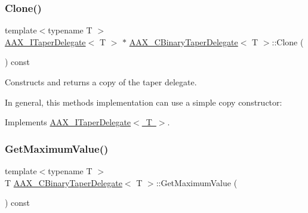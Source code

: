 \subsubsection{\texorpdfstring{Clone()}{Clone()}}
{\footnotesize\ttfamily template$<$typename T $>$ \\
\mbox{\hyperlink{a01881}{A\+A\+X\+\_\+\+I\+Taper\+Delegate}}$<$ T $>$ $\ast$ \mbox{\hyperlink{a01457}{A\+A\+X\+\_\+\+C\+Binary\+Taper\+Delegate}}$<$ T $>$\+::Clone (\begin{DoxyParamCaption}{ }\end{DoxyParamCaption}) const\hspace{0.3cm}{\ttfamily [virtual]}}



Constructs and returns a copy of the taper delegate. 

In general, this method\textquotesingle{}s implementation can use a simple copy constructor\+:


\begin{DoxyCode}{0}
\DoxyCodeLine{\textcolor{keyword}{}\{}
\DoxyCodeLine{\}}
\end{DoxyCode}
 

Implements \mbox{\hyperlink{a01881_a80ce054ca716147155fe0682adf4e469}{A\+A\+X\+\_\+\+I\+Taper\+Delegate$<$ T $>$}}.

\mbox{\label{a01457_a1abc18860a0c404676c52d8d1d8b7724}} 
\subsubsection{\texorpdfstring{GetMaximumValue()}{GetMaximumValue()}}
{\footnotesize\ttfamily template$<$typename T $>$ \\
T \mbox{\hyperlink{a01457}{A\+A\+X\+\_\+\+C\+Binary\+Taper\+Delegate}}$<$ T $>$\+::Get\+Maximum\+Value (\begin{DoxyParamCaption}{ }\end{DoxyParamCaption}) const\hspace{0.3cm}{\ttfamily [virtual]}}



